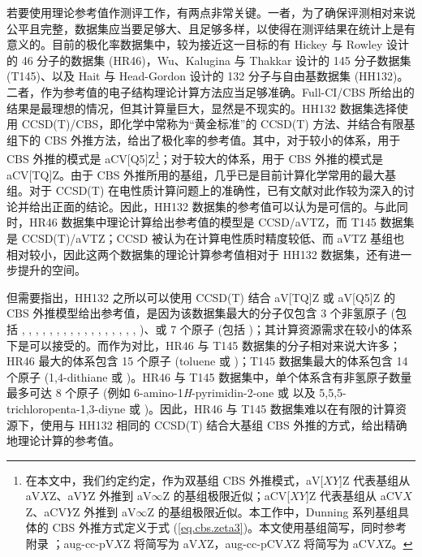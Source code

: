 若要使用理论参考值作测评工作，有两点非常关键。一者，为了确保评测相对来说公平且完整，数据集应当要足够大、且足够多样，以使得在测评结果在统计上是有意义的。目前的极化率数据集中，较为接近这一目标的有 Hickey 与 Rowley 设计的 46 分子的数据集 (HR46)\cite{Hickey-Rowley.JPCA.2014}，Wu、Kalugina 与 Thakkar 设计的 145 分子数据集 (T145)\cite{Wu-Thakkar.CPL.2015}、以及 Hait 与 Head-Gordon 设计的 132 分子与自由基数据集 (HH132)\cite{Hait-Head-Gordon.PCCP.2018}。二者，作为参考值的电子结构理论计算方法应当足够准确。Full-CI/CBS 所给出的结果是最理想的情况，但其计算量巨大，显然是不现实的。HH132 数据集选择使用 CCSD(T)/CBS，即化学中常称为“黄金标准”的 CCSD(T) 方法、并结合有限基组下的 CBS 外推方法\cite{Nyden-Petersson.JCP.1981, Petersson-Mantzaris.JCP.1988}，给出了极化率的参考值。其中，对于较小的体系，用于 CBS 外推的模式是 aCV[Q5]Z\footnote{在本文中，我们约定约定，作为双基组 CBS 外推模式，aV[$XY$]Z 代表基组从 aV$X$Z、aV$Y$Z 外推到 aV$\infty$Z 的基组极限近似；aCV[$XY$]Z 代表基组从 aCV$X$Z、aCV$Y$Z 外推到 aV$\infty$Z 的基组极限近似。本工作中，Dunning 系列基组具体的 CBS 外推方式定义于式 (\ref{eq.cbs.zeta3})。本文使用基组简写，同时参考附录 ；aug-cc-pV$X$Z 将简写为 aV$X$Z，aug-cc-pCV$X$Z 将简写为 aCV$X$Z。}；对于较大的体系，用于 CBS 外推的模式是 aCV[TQ]Z\cite{Hait-Head-Gordon.PCCP.2018, Hait-Head-Gordon.JCTC.2018}。由于 CBS 外推所用的基组，几乎已是目前计算化学常用的最大基组。对于 CCSD(T) 在电性质计算问题上的准确性，已有文献对此作较为深入的讨论并给出正面的结论\cite{Halkier-Joergensen.JCP.1999, Monten-Deleuze.MP.2011, Hait-Head-Gordon.JCTC.2018}。因此，HH132 数据集的参考值可以认为是可信的。与此同时，HR46 数据集中理论计算给出参考值的模型是 CCSD/aVTZ，而 T145 数据集是 CCSD(T)/aVTZ；CCSD 被认为在计算电性质时精度较低、而 aVTZ 基组也相对较小，因此这两个数据集的理论计算参考值相对于 HH132 数据集，还有进一步提升的空间。

但需要指出，HH132 之所以可以使用 CCSD(T) 结合 aV[TQ]Z 或 aV[Q5]Z 的 CBS 外推模型给出参考值，是因为该数据集最大的分子仅包含 3 个非氢原子 (包括 , , , , , , , , , , , , , , , , , )、或 7 个原子 (包括 )；其计算资源需求在较小的体系下是可以接受的。而作为对比，HR46 与 T145 数据集的分子相对来说大许多；HR46 最大的体系包含 15 个原子 (toluene 或 )；T145 数据集最大的体系包含 14 个原子 (1,4-dithiane 或 )。HR46 与 T145 数据集中，单个体系含有非氢原子数量最多可达 8 个原子 (例如 6-amino-1\textit{H}-pyrimidin-2-one 或  以及 5,5,5-trichloropenta-1,3-diyne 或 )。因此，HR46 与 T145 数据集难以在有限的计算资源下，使用与 HH132 相同的 CCSD(T) 结合大基组 CBS 外推的方式，给出精确地理论计算的参考值。

